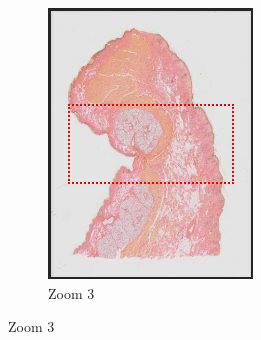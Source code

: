 \documentclass[a4paper,11pt]{report}
\numberwithin{figure}{section} %
\begin{document}
\begin{itemize}
\begin{figure}[H]
\begin{subfigure}[b]{0.3\textwidth}
            \includegraphics[width=\textwidth]{images/zooms3.png}
            \caption{Zoom 3}
            \end{subfigure}


\end{figure}
\end{itemize}
\end{document}
